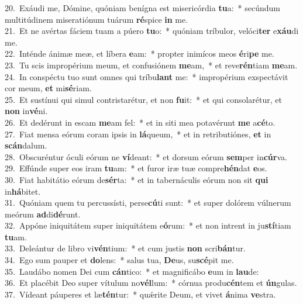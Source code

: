 {20.~}Exáudi me, Dómine, quóniam benígna est misericórdia \textbf{tu}a:~* secúndum multitúdinem miseratiónum tuárum \textbf{ré}spice \textbf{in} me.\\
{21.~}Et ne avértas fáciem tuam a púero \textbf{tu}o:~* quóniam tríbulor, velóci\textbf{ter} e\textbf{xáu}di me.\\
{22.~}Inténde ánimæ meæ, et líbera \textbf{e}am:~* propter inimícos meos \textbf{é}ri\textbf{pe} me.\\
{23.~}Tu scis impropérium meum, et confusiónem \textbf{me}am,~* et reve\textbf{rén}tiam \textbf{me}am.\\
{24.~}In conspéctu tuo sunt omnes qui tríbu\textbf{lant} me:~* impropérium exspectávit cor meum, \textbf{et} mi\textbf{sé}riam.\\
{25.~}Et sustínui qui simul contristarétur, et non \textbf{fu}it:~* et qui consolarétur, et \textbf{non} in\textbf{vé}ni.\\
{26.~}Et dedérunt in escam \textbf{me}am fel:~* et in siti mea potavérunt \textbf{me} a\textbf{cé}to.\\
{27.~}Fiat mensa eórum coram ipsis in \textbf{lá}queum,~* et in retributiónes, \textbf{et} in \textbf{scán}dalum.\\
{28.~}Obscuréntur óculi eórum ne \textbf{ví}deant:~* et dorsum eórum \textbf{sem}per in\textbf{cúr}va.\\
{29.~}Effúnde super eos iram \textbf{tu}am:~* et furor iræ tuæ compre\textbf{hén}dat \textbf{e}os.\\
{30.~}Fiat habitátio eórum de\textbf{sér}ta:~* et in tabernáculis eórum non sit \textbf{qui} in\textbf{há}bitet.\\
{31.~}Quóniam quem tu percussísti, perse\textbf{cú}ti sunt:~* et super dolórem vúlnerum meórum \textbf{ad}di\textbf{dé}runt.\\
{32.~}Appóne iniquitátem super iniquitátem e\textbf{ó}rum:~* et non intrent in ju\textbf{stí}tiam \textbf{tu}am.\\
{33.~}Deleántur de libro vi\textbf{vén}tium:~* et cum justis \textbf{non} scri\textbf{bán}tur.\\
{34.~}Ego sum pauper et \textbf{do}lens:~* salus tua, \textbf{De}us, su\textbf{scé}pit me.\\
{35.~}Laudábo nomen Dei cum \textbf{cán}tico:~* et magnificábo \textbf{e}um in \textbf{lau}de:\\
{36.~}Et placébit Deo super vítulum no\textbf{vél}lum:~* córnua produ\textbf{cén}tem et \textbf{ún}gulas.\\
{37.~}Vídeant páuperes et læ\textbf{tén}tur:~* quǽrite Deum, et vivet \textbf{á}nima \textbf{ve}stra.\\
